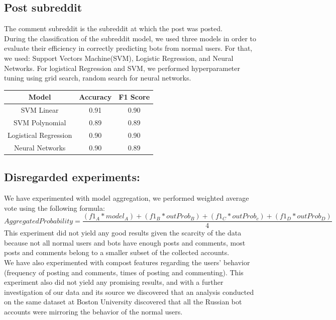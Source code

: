 \documentclass{article}
\begin{document}
    \subsection{Post subreddit}  
    
        The comment subreddit is the subreddit at which the post was posted. \\
    During the classification of  the subreddit model, we used three models in order to evaluate their efficiency in correctly predicting bots from normal users. For that, we used: Support Vectors Machine(SVM), Logistic Regression, and Neural Networks.
For logistical Regression and SVM, we performed hyperparameter tuning using grid search, random search for neural networks.

        \begin{center}
    \begin{tabular}{|c || c| c|} 
     \hline
     Model & Accuracy  & F1 Score  \\ [0.5ex] 
     \hline\hline
     SVM Linear & 0.91  & 0.90 \\ 
     \hline
     SVM Polynomial & 0.89 &0.89 \\
     \hline
     Logistical Regression & 0.90 & 0.90  \\ 
     \hline
     Neural Networks & 0.90  & 0.89\\
     \hline

    \end{tabular}
    \end{center}  
    
            \subsection{Disregarded experiments:}
        We have experimented with model aggregation, we performed weighted average vote using the following formula:
        $$AggregatedProbability = \frac{(f1_A * model_A) 
                                    + (f1_B * outProb_B) 
                                    + (f1_C * outProb_c) 
                                    + (f1_D * outProb_D)}{4}$$
        This experiment did not yield any good results given the scarcity of the data because not all normal users and bots have enough posts and comments, most posts and comments belong to a smaller subset of the collected accounts.\\
        We have also experimented with compost features regarding the users' behavior (frequency of posting and comments, times of posting and commenting). This experiment also did not yield any promising results, and with a further investigation of our data and its source we discovered that an analysis conducted on the same dataset at Boston University discovered that all the Russian bot accounts were mirroring the behavior of the normal users.
        
\end{document}
